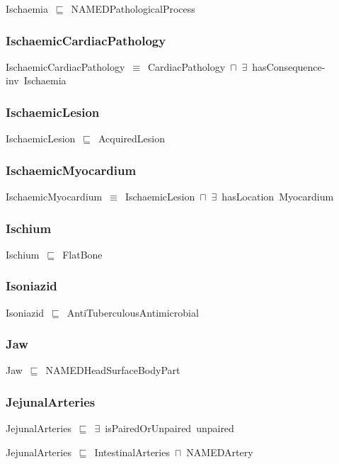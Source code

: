 \documentclass{article}
\begin{document}
Ischaemia~\ensuremath{\sqsubseteq}~NAMEDPathologicalProcess~

\subsubsection*{IschaemicCardiacPathology}

IschaemicCardiacPathology~\ensuremath{\equiv}~CardiacPathology~\ensuremath{\sqcap}~\ensuremath{\exists}~hasConsequence-inv~Ischaemia

\subsubsection*{IschaemicLesion}

IschaemicLesion~\ensuremath{\sqsubseteq}~AcquiredLesion~

\subsubsection*{IschaemicMyocardium}

IschaemicMyocardium~\ensuremath{\equiv}~IschaemicLesion~\ensuremath{\sqcap}~\ensuremath{\exists}~hasLocation~Myocardium

\subsubsection*{Ischium}

Ischium~\ensuremath{\sqsubseteq}~FlatBone~

\subsubsection*{Isoniazid}

Isoniazid~\ensuremath{\sqsubseteq}~AntiTuberculousAntimicrobial~

\subsubsection*{Jaw}

Jaw~\ensuremath{\sqsubseteq}~NAMEDHeadSurfaceBodyPart~

\subsubsection*{JejunalArteries}

JejunalArteries~\ensuremath{\sqsubseteq}~\ensuremath{\exists}~isPairedOrUnpaired~unpaired~

JejunalArteries~\ensuremath{\sqsubseteq}~IntestinalArteries~\ensuremath{\sqcap}~NAMEDArtery~
\end{document}
